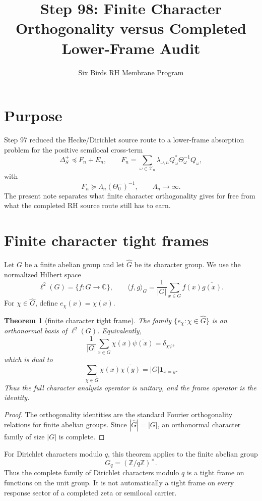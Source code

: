 \documentclass[11pt]{article}
\title{Step 98: Finite Character Orthogonality versus Completed Lower-Frame Audit}
\author{Six Birds RH Membrane Program}
\date{}
\newtheorem{theorem}{Theorem}
\begin{document}
\maketitle

\section{Purpose}
Step 97 reduced the Hecke/Dirichlet source route to a lower-frame absorption problem for the positive semilocal cross-term
\[
  \Delta_S^+ \preceq F_n+E_n,
  \qquad
  F_n=\sum_{\omega\in\mathcal X_n}\lambda_{\omega,n}
  Q_\omega^*\Theta_\omega^{-1}Q_\omega,
\]
with
\[
  F_n\succeq \Lambda_n(\Theta_0^-)^{-1},
  \qquad \Lambda_n\to\infty.
\]
The present note separates what finite character orthogonality gives for free from what the completed RH source route still has to earn.

\section{Finite character tight frames}
Let $G$ be a finite abelian group and let $\widehat G$ be its character group.  We use the normalized Hilbert space
\[
  \ell^2(G)=\{f:G\to\mathbb C\},
  \qquad
  \langle f,g\rangle_G=\frac1{|G|}\sum_{x\in G}f(x)\overline{g(x)}.
\]
For $\chi\in\widehat G$, define $e_\chi(x)=\chi(x)$.

\begin{theorem}[finite character tight frame]
The family $\{e_\chi:\chi\in\widehat G\}$ is an orthonormal basis of $\ell^2(G)$.  Equivalently,
\[
  \frac1{|G|}\sum_{x\in G}\chi(x)\overline{\psi(x)}=\delta_{\chi\psi},
\]
which is dual to
\[
  \sum_{\chi\in\widehat G}\chi(x)\overline{\chi(y)}=|G|\mathbf 1_{x=y}.
\]
Thus the full character analysis operator is unitary, and the frame operator is the identity.
\end{theorem}

\begin{proof}
The orthogonality identities are the standard Fourier orthogonality relations for finite abelian groups.  Since $|\widehat G|=|G|$, an orthonormal character family of size $|G|$ is complete.
\end{proof}

For Dirichlet characters modulo $q$, this theorem applies to the finite abelian group
\[
  G_q=(\mathbb Z/q\mathbb Z)^\times.
\]
Thus the complete family of Dirichlet characters modulo $q$ is a tight frame on functions on the unit group.  It is not automatically a tight frame on every response sector of a completed zeta or semilocal carrier.
\end{document}
